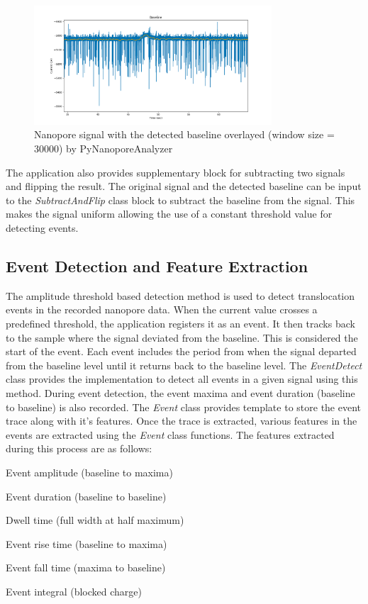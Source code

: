 \documentclass[journal]{IEEEtran}
\begin{document}
\begin{figure}[!t]
  \centering
  \includegraphics[width=3.49in]{imgs/PyNA_Dimer_Baseline.png}
  \caption{Nanopore signal with the detected baseline overlayed (window size = 30000) by PyNanoporeAnalyzer}
  \label{fig_4}
  \end{figure}

The application also provides supplementary block for subtracting two signals and flipping the result. The original signal and the detected baseline can be input to the \textit{SubtractAndFlip} class block to subtract the baseline from the signal. This makes the signal uniform allowing the use of a constant threshold value for detecting events. 

\subsection{Event Detection and Feature Extraction}
The amplitude threshold based detection method is used to detect translocation events in the recorded nanopore data. When the  current value crosses a predefined threshold, the application registers it as an event. It then tracks back to the sample where the signal deviated from the baseline. This is considered the start of the event. Each event includes the period from when the signal departed from the baseline level until it returns back to the baseline level. The \textit{EventDetect} class provides the implementation to detect all events in a given signal using this method. During event detection, the event maxima and event duration (baseline to baseline) is also recorded. The \textit{Event} class provides template to store the event trace along with it's features. Once the trace is extracted, various features in the events are extracted using the \textit{Event} class functions. The features extracted during this process are as follows:
\begin{list}{}{}
  \item Event amplitude (baseline to maxima)
  \item Event duration (baseline to baseline)
  \item Dwell time (full width at half maximum)
  \item Event rise time (baseline to maxima)
  \item Event fall time (maxima to baseline)
  \item Event integral (blocked charge)
\end{list}
\end{document}
